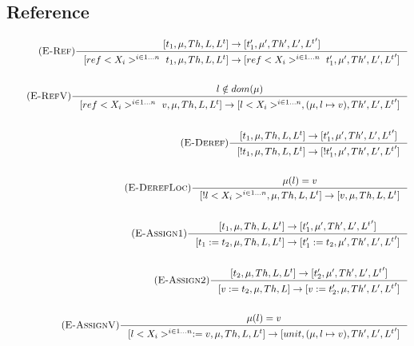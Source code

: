 \documentclass[12pt]{article}
\begin{document}
\subsection{Reference}
\begin{align*}
    \tag {\textsc{E-Ref}}
    \inference[]{[t_1,\mu,Th,L,L^t]->[t_1',\mu ',Th', L',{L^t}']}{[ref<X_i>^{i\in 1...n}~t_1,\mu,Th,L,L^t]-> [ref<X_i>^{i\in 1...n}~t_1',\mu',Th',L',{L^t}']}
    \\
    \\
    \tag {\textsc{E-RefV}}
    \inference[]{l\notin dom(\mu)}{[ref<X_i>^{i\in 1...n}~v,\mu,Th,L,L^t] -> [l <X_i>^{i\in1...n},(\mu,l\mapsto v),Th', L',{L^t}']} 
    \\
    \\
    \tag {\textsc{E-Deref}}
    \inference[]{[t_1,\mu,Th,L,L^t]->[t_1',\mu',Th', L',{L^t}']}{[!t_1,\mu,Th,L,L^t] -> [!t_1',\mu',Th', L',{L^t}']}
    \\
    \\
    \tag {\textsc{E-DerefLoc}}
    \inference[]{\mu(l)=v}{[!l <X_i>^{i\in1...n},\mu,Th,L,L^t] -> [v,\mu,Th,L,L^t]}
    \\
    \\
    \tag {\textsc{E-Assign1}}
    \inference[]{[t_1,\mu,Th,L,L^t]->[t_1',\mu',Th', L',{L^t}']}{[t_1:=t_2,\mu,Th,L,L^t] -> [t_1':=t_2,\mu',Th', L',{L^t}']}
    \\
    \\
    \tag {\textsc{E-Assign2}}
    \inference[]{[t_2,\mu,Th,L,L^t]->[t_2',\mu',Th', L',{L^t}']}{[v:=t_2,\mu,Th,L ]-> [v:=t_2',\mu,Th',L',{L^t}']}
    \\
    \\
    \tag {\textsc{E-AssignV}}
    \inference[]{\mu(l)=v}{[l <X_i>^{i\in1...n}:=v,\mu,Th,L,L^t] -> [unit,(\mu,l\mapsto v),Th',L',{L^t}']}
\end{align*}
\end{document}

